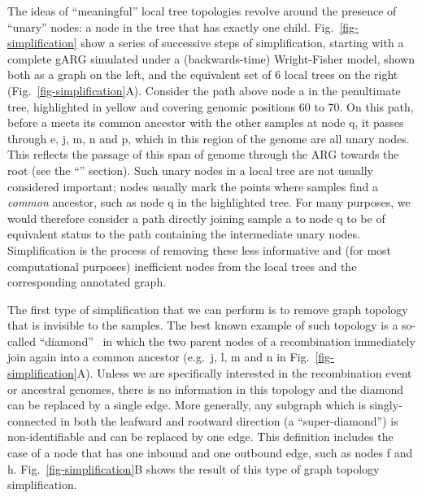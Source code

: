 \documentclass{article}
\begin{document}
The ideas of ``meaningful'' local tree topologies revolve around the
presence of ``unary'' nodes: a node in the tree that has exactly
one child. Fig.~\ref{fig-simplification} show a series of successive steps of
simplification, starting with a complete gARG simulated under a
(backwards-time) Wright-Fisher
model, shown both as a graph on the left, and the equivalent set of 6
local trees on the right (Fig.~\ref{fig-simplification}A). Consider the path above node
\textsf{a} in the penultimate tree, highlighted in yellow and covering genomic positions
60 to 70. On this path, before \textsf{a} meets its common ancestor with the other samples at
node \textsf{q}, it passes through  \textsf{e},  \textsf{j},  \textsf{m},  \textsf{n} and
\textsf{p}, which in this region of the genome are all unary nodes. This reflects the
passage of this span of genome through the ARG towards the root (see the
``'' section).
Such unary nodes in a local tree are not usually considered important;
nodes usually mark the points where samples find a
 \emph{common} ancestor, such as node \textsf{q} in the highlighted
tree. For many purposes, we would therefore consider a path directly
joining sample \textsf{a} to node \textsf{q} to be of equivalent status to the path
containing the intermediate unary nodes. Simplification is the process of removing
these less informative and (for most computational purposes) inefficient nodes
from the local trees and the corresponding annotated graph.

The first type of simplification that we can perform is to remove
graph topology that is invisible to the samples. The best
known example of such topology is a so-called
``diamond''~\citep{rasmussen2014genome}
in which the two parent nodes of a recombination immediately
join again into a common ancestor (e.g.~\textsf{j}, \textsf{l}, \textsf{m}
and  \textsf{n} in Fig.~\ref{fig-simplification}A).
Unless we are specifically
interested in the recombination event or ancestral genomes,
there is no information in this topology and the diamond can be
replaced by a single edge. More generally, any
subgraph which is singly-connected in both the leafward and
rootward direction (a ``super-diamond'') is non-identifiable and can be
replaced by one edge. This definition includes the case
of a node that has one inbound and one outbound edge, such as
nodes \textsf{f} and \textsf{h}.
Fig.~\ref{fig-simplification}B shows the result of this type of
graph topology simplification.
\end{document}
